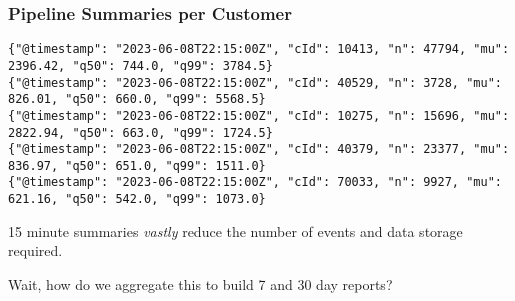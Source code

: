 \begin{frame}[fragile]
    \frametitle{Pipeline Summaries per Customer}

\begin{lstlisting}
{"@timestamp": "2023-06-08T22:15:00Z", "cId": 10413, "n": 47794, "mu": 2396.42, "q50": 744.0, "q99": 3784.5} 
{"@timestamp": "2023-06-08T22:15:00Z", "cId": 40529, "n": 3728, "mu": 826.01, "q50": 660.0, "q99": 5568.5} 
{"@timestamp": "2023-06-08T22:15:00Z", "cId": 10275, "n": 15696, "mu": 2822.94, "q50": 663.0, "q99": 1724.5} 
{"@timestamp": "2023-06-08T22:15:00Z", "cId": 40379, "n": 23377, "mu": 836.97, "q50": 651.0, "q99": 1511.0} 
{"@timestamp": "2023-06-08T22:15:00Z", "cId": 70033, "n": 9927, "mu": 621.16, "q50": 542.0, "q99": 1073.0} 
\end{lstlisting}

15 minute summaries \textit{vastly} reduce the number of events and data storage
required.

Wait, how do we aggregate this to build 7 and 30 day reports?

\end{frame}

